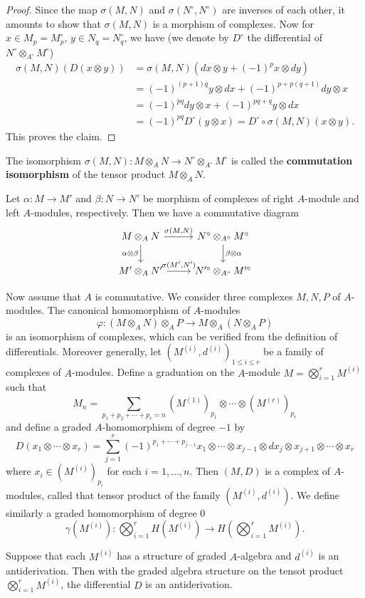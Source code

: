 \begin{proof}
Since the map $\sigma(M,N)$ and $\sigma(N^{\circ},N^{\circ})$ are inverses of each other, it amounts to show that $\sigma(M,N)$ is a morphism of complexes. Now for $x\in M_p=M_p^{\circ}$, $y\in N_q=N_q^{\circ}$, we have (we denote by $D^{\circ}$ the differential of $N^{\circ}\otimes_{A^{\circ}}M^{\circ}$)
\begin{align*}
\sigma(M,N)(D(x\otimes y))&=\sigma(M,N)(dx\otimes y+(-1)^px\otimes dy)\\
&=(-1)^{(p+1)q}y\otimes dx+(-1)^{p+p(q+1)}dy\otimes x\\
&=(-1)^{pq}dy\otimes x+(-1)^{pq+q}y\otimes dx\\
&=(-1)^{pq}D^\circ(y\otimes x)=D^\circ\circ\sigma(M,N)(x\otimes y).
\end{align*}
This proves the claim.
\end{proof}
The isomorphism $\sigma(M,N):M\otimes_AN\to N^{\circ}\otimes_{A^{\circ}}M^{\circ}$ is called the \textbf{commutation isomorphism} of the tensor product $M\otimes_AN$.\par
Let $\alpha:M\to M'$ and $\beta:N\to N'$ be morphism of complexes of right $A$-module and left $A$-modules, respectively. Then we have a commutative diagram
\[\begin{tikzcd}
M\otimes_AN\ar[d,swap,"\alpha\otimes\beta"]\ar[r,"{\sigma(M,N)}"]&N^{\circ}\otimes_{A^{\circ}}M^{\circ}\ar[d,"\beta\otimes\alpha"]\\
M'\otimes_AN'\ar[r,"{\sigma(M',N')}"]&N'^{\circ}\otimes_{A^{\circ}}M'^{\circ}
\end{tikzcd}\]

Now assume that $A$ is commutative. We consider three complexes $M,N,P$ of $A$-modules. The canonical homomorphism of $A$-modules
\[\varphi:(M\otimes_AN)\otimes_AP\to M\otimes_A(N\otimes_AP)\]
is an isomorphism of complexes, which can be verified from the definition of differentials. Moreover generally, let $(M^{(i)},d^{(i)})_{1\leq i\leq r}$ be a family of complexes of $A$-modules. Define a graduation on the $A$-module $M=\bigotimes_{i=1}^{r}M^{(i)}$ such that
\[M_n=\sum_{p_1+p_2+\cdots+p_r=n}(M^{(1)})_{p_1}\otimes\cdots\otimes(M^(r))_{p_r}\]
and define a graded $A$-homomorphism of degree $-1$ by
\[D(x_1\otimes\cdots\otimes x_r)=\sum_{j=1}^{r}(-1)^{p_1+\cdots+p_{j-1}}x_1\otimes\cdots\otimes x_{j-1}\otimes dx_j\otimes x_{j+1}\otimes\cdots\otimes x_r\]
where $x_i\in(M^{(i)})_{p_i}$ for each $i=1,\dots,n$. Then $(M,D)$ is a complex of $A$-modules, called that tensor product of the family $(M^{(i)},d^{(i)})$. We define similarly a graded homomorphism of degree $0$
\[\gamma(M^{(i)}):\bigotimes_{i=1}^{r}H(M^{(i)})\to H(\bigotimes_{i=1}^{r}M^{(i)}).\]
\begin{remark}\label{module complex tensor product antiderivation}
Suppose that each $M^{(i)}$ has a structure of graded $A$-algebra and $d^{(i)}$ is an antiderivation. Then with the graded algebra structure on the tensot product $\bigotimes_{i=1}^{r}M^{(i)}$, the differential $D$ is an antiderivation.
\end{remark}
